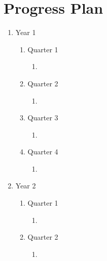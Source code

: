 \documentclass[11pt,a4paper]{article}
\begin{document}
\section{Progress Plan}
\begin{enumerate}    
  \item Year 1

  \begin{enumerate}
    \item Quarter 1
    
    \begin{enumerate}
      \item
    \end{enumerate}
    
    \item Quarter 2
    
    \begin{enumerate} 
      \item 
    \end{enumerate}
    \item Quarter 3
    
    \begin{enumerate}
      \item 
    \end{enumerate}
    
    \item Quarter 4
    
    \begin{enumerate}
      \item 
    \end{enumerate}


  \end{enumerate}

\item Year 2

  \begin{enumerate}
    
    \item Quarter 1
    
    \begin{enumerate}
      \item 
    \end{enumerate}
    
    \item Quarter 2
    
    \begin{enumerate}
      \item 
    \end{enumerate}
    

\end{enumerate}
\end{enumerate}
\end{document}
